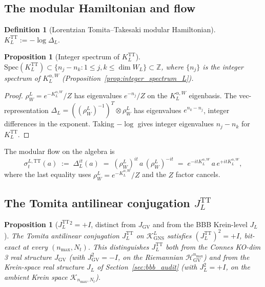 \documentclass[11pt,a4paper]{article}
\theoremstyle{plain}
\newtheorem{proposition}[theorem]{Proposition}
\theoremstyle{definition}
\newtheorem{definition}[theorem]{Definition}
\newcommand{\nmax}{n_{\max}}
\newcommand{\Nt}{N_t}
\newcommand{\Hilb}{\mathcal{H}}
\newcommand{\Krein}{\mathcal{K}}
\newcommand{\Z}{\mathbb{Z}}
\newcommand{\KL}{K_{L}}
\newcommand{\JL}{J_{L}}
\newcommand{\TT}{\mathrm{TT}}
\newcommand{\GNS}{\mathrm{GNS}}
\begin{document}
\subsection{The modular Hamiltonian and flow}\label{sec:K_L_TT}

\begin{definition}[Lorentzian Tomita--Takesaki modular Hamiltonian]
\label{def:K_L_TT}
$\KL^\TT := -\log \Delta_L$.
\end{definition}

\begin{proposition}[Integer spectrum of $\KL^\TT$]\label{prop:K_L_TT_spectrum}
$\mathrm{Spec}(\KL^\TT) \subset \{n_j - n_k : 1 \le j, k \le \dim W_L\}
\subset \Z$, where $\{n_j\}$ is the integer spectrum of
$\KL^{\alpha, W}$ (Proposition~\ref{prop:integer_spectrum_L}).
\end{proposition}

\begin{proof}
$\rho_W^L = e^{-\KL^{\alpha, W}}/Z$ has eigenvalues $e^{-n_j}/Z$ on
the $\KL^{\alpha, W}$ eigenbasis. The vec-representation
$\Delta_L = ((\rho_W^L)^{-1})^T \otimes \rho_W^L$ has eigenvalues
$e^{n_k - n_j}$, integer differences in the exponent. Taking
$-\log$ gives integer eigenvalues $n_j - n_k$ for $\KL^\TT$.
\end{proof}

The modular flow on the algebra is
\begin{equation}\label{eq:TT_flow_L}
   \sigma_t^{L, \TT}(a)
   \;:=\; \Delta_L^{it}(a)
   \;=\; (\rho_W^L)^{it}\, a\, (\rho_W^L)^{-it}
   \;=\; e^{-i t \KL^{\alpha, W}}\, a\, e^{+i t \KL^{\alpha, W}},
\end{equation}
where the last equality uses $\rho_W^L = e^{-\KL^{\alpha, W}}/Z$ and
the $Z$ factor cancels.

\subsection{The Tomita antilinear conjugation $\JL^\TT$}\label{sec:J_L_TT}

\begin{proposition}[$\JL^{\TT}{}^2 = +I$, distinct from
$J_{\mathrm{GV}}$ and from the BBB Krein-level $\JL$]
\label{prop:J_L_TT}
The Tomita antilinear conjugation $\JL^\TT$ on $\Krein_{\GNS}^L$
satisfies $(\JL^\TT)^2 = +I$, bit-exact at every $(\nmax, \Nt)$. This
distinguishes $\JL^\TT$ both from the Connes KO-dim 3 real structure
$J_{\mathrm{GV}}$ (with $J_{\mathrm{GV}}^2 = -I$, on the Riemannian
$\Hilb_{\mathrm{GV}}^{\nmax}$) and from the Krein-space real structure
$\JL$ of Section~\ref{sec:bbb_audit} (with $\JL^2 = +I$, on the
ambient Krein space $\Krein_{\nmax, \Nt}$).
\end{proposition}
\end{document}
